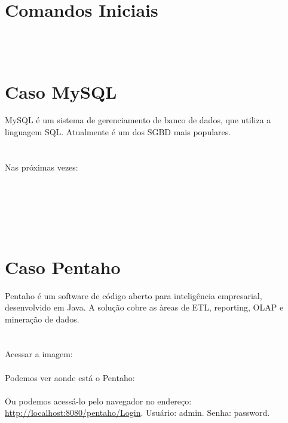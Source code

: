 \documentclass[a4paper,11pt]{article}
\begin{document}
	
\maketitle %
\thispagestyle{fancy} %
	
\section*{Comandos Iniciais}
 \\
 \\

\section{Caso MySQL}
MySQL é um sistema de gerenciamento de banco de dados, que utiliza a linguagem SQL. Atualmente é um dos SGBD mais populares. \\
 \\
 \\[2mm]
Nas próximas vezes: \\
 \\
 \\
 \\
 \\
 \\

\section{Caso Pentaho}
Pentaho é um software de código aberto para inteligência empresarial, desenvolvido em Java. A solução cobre as àreas de ETL, reporting, OLAP e mineração de dados. \\
 \\
 \\[2mm]
Acessar a imagem: \\
 \\[2mm]
Podemos ver aonde está o Pentaho: \\
 \\[2mm]
Ou podemos acessá-lo pelo navegador no endereço: \url{http://localhost:8080/pentaho/Login}. Usuário: admin. Senha: password.
\end{document}
